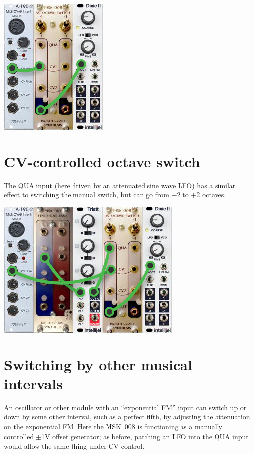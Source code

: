 {\hspace*{\fill}\includegraphics[scale=0.8]{patch1.png}\hspace*{\fill}\par} 

\section{CV-controlled octave switch}

The QUA input (here driven by an attenuated sine wave LFO) has a similar
effect to switching the manual switch, but can go from $-$2 to $+$2 octaves.

{\hspace*{\fill}\includegraphics[scale=0.8]{patch2.png}\hspace*{\fill}\par} 

\section{Switching by other musical intervals}

An oscillator or other module with an ``exponential FM'' input can switch up
or down by some other interval, such as a perfect fifth, by adjusting the
attenuation on the exponential FM.  Here the MSK~008 is functioning as
a manually controlled $\pm$1V offset generator; as before, patching an LFO
into the QUA input would allow the same thing under CV control.

